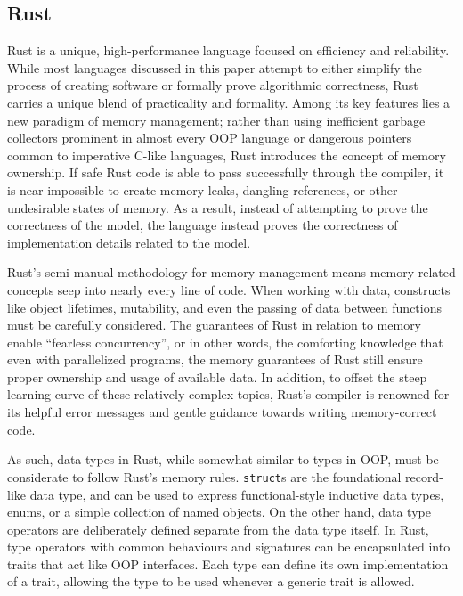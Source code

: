 \documentclass{article}
\begin{document}
\subsection{Rust}

Rust is a unique, high-performance language focused on efficiency and reliability.
While most languages discussed in this paper attempt to either simplify the process of creating software or
formally prove algorithmic correctness, Rust carries a unique blend of practicality and formality.
Among its key features lies a new paradigm of memory management;
rather than using inefficient garbage collectors prominent in almost every OOP language
or dangerous pointers common to imperative C-like languages, Rust introduces the concept of memory ownership.
If safe Rust code is able to pass successfully through the compiler,
it is near-impossible to create memory leaks, dangling references, or other undesirable states of memory.
As a result, instead of attempting to prove the correctness of the model, the language instead proves the correctness
of implementation details related to the model.

Rust's semi-manual methodology for memory management means memory-related concepts seep into nearly every line of code.
When working with data, constructs like object lifetimes, mutability, and even the passing of data between functions
must be carefully considered. The guarantees of Rust in relation to memory enable ``fearless concurrency'', or in other words,
the comforting knowledge that even with parallelized programs, the memory guarantees of Rust still ensure proper
ownership and usage of available data. In addition, to offset the steep learning curve of these relatively complex topics,
Rust's compiler is renowned for its helpful error messages and gentle guidance towards writing memory-correct code.

As such, data types in Rust, while somewhat similar to types in OOP, must be considerate to follow Rust's memory rules.
\texttt{struct}s are the foundational record-like data type, and can be used to express functional-style inductive data types,
enums, or a simple collection of named objects. On the other hand, data type operators
are deliberately defined separate from the data type itself. In Rust, type operators with common behaviours and signatures
can be encapsulated into traits that act like OOP interfaces. Each type can define its own implementation of a trait,
allowing the type to be used whenever a generic trait is allowed.
\end{document}

